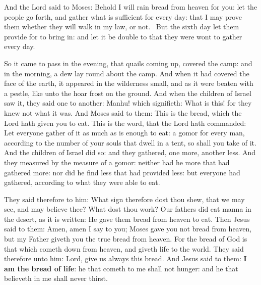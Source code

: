 \begin{multicols}{2}\small
And the Lord said to Moses: Behold I will rain bread from heaven for you: let the people go forth, and gather what is
sufficient for every day: that I may prove them whether they will walk in my law, or not.  But the sixth day let them
provide for to bring in: and let it be double to that they were wont to gather every day. 

So it came to pass in the evening, that quails coming up, covered the camp: and in the morning, a dew lay round about
the camp. And when it had covered the face of the earth, it appeared in the wilderness small, and as it were beaten
with a pestle, like unto the hoar frost on the ground. And when the children of Israel saw it, they said one to
another: Manhu! which signifieth: What is this! for they knew not what it was. And Moses said to them: This is the
bread, which the Lord hath given you to eat. This is the word, that the Lord hath commanded: Let everyone gather of it
as much as is enough to eat: a gomor for every man, according to the number of your souls that dwell in a tent, so
shall you take of it. And the children of Israel did so: and they gathered, one more, another less. And they measured
by the measure of a gomor: neither had he more that had gathered more: nor did he find less that had provided less: but
everyone had gathered, according to what they were able to eat. 

They said therefore to him: What sign therefore dost thou shew, that we may see, and may believe thee? What dost thou
work? Our fathers did eat manna in the desert, as it is written: He gave them bread from heaven to eat. Then Jesus said
to them: Amen, amen I say to you; Moses gave you not bread from heaven, but my Father giveth you the true bread from
heaven. For the bread of God is that which cometh down from heaven, and giveth life to the world. They said therefore
unto him: Lord, give us always this bread. And Jesus said to them: \textbf{I am the bread of life}: he that cometh to
me shall not hunger: and he that believeth in me shall never thirst. 
\end{multicols}

